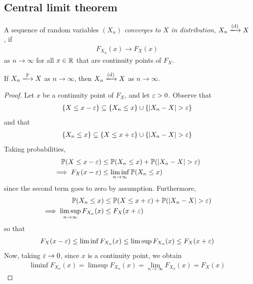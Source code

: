 \documentclass{../template/note}
\begin{document}
    \subsection{Central limit theorem}

    \begin{definition}
        A sequence of random variables \((X_n)\) \emph{converges to \(X\) in distribution}, \(X_n \dto X\), if
        \begin{align*}
            F_{X_n}(x) \to F_X(x)
        \end{align*}
        as \(n \to \infty\) for all \(x \in \mathbb R\) that are continuity points of \(F_X\).
    \end{definition}

    
    \begin{proposition}
        If \(X_n \pto X\) as \(n \to \infty\), then \(X_n \dto X\) as \(n \to \infty\).
    \end{proposition}
    
    \begin{proof}
        Let \(x\) be a continuity point of \(F_X\), and let \(\varepsilon > 0\). Observe that
        \begin{align*}
            \{X \leq x - \varepsilon\} \subseteq \{X_n \leq x\} \cup \{|X_n-X| > \varepsilon\}
        \end{align*}
        and that
        \begin{align*}
            \{X_n \leq x\} \subseteq \{X \leq x+\varepsilon\} \cup \{|X_n-X| > \varepsilon\}
        \end{align*}
        Taking probabilities,
        \begin{align*}
            \mathbb P(X \leq x-\varepsilon) &\leq \mathbb P(X_n \leq x) + \mathbb P(|X_n-X| > \varepsilon) \\
            \implies F_X(x-\varepsilon) &\leq \liminf_{n \to \infty} \mathbb P(X_n \leq x)
        \end{align*}
        since the second term goes to zero by assumption. Furthermore,
        \begin{align*}
            \mathbb P(X_n \leq x) &\leq \mathbb P(X \leq x + \varepsilon) + \mathbb P(|X_n-X| > \varepsilon) \\
            \implies \limsup_{n \to \infty} F_{X_n}(x) &\leq F_X(x+\varepsilon)
        \end{align*}
        so that
        \begin{align*}
            F_X(x-\varepsilon) \leq \liminf F_{X_n}(x) \leq \limsup F_{X_n}(x) \leq F_X(x+\varepsilon)
        \end{align*}
        Now, taking \(\varepsilon \to 0\), since \(x\) is a continuity point, we obtain
        \begin{align*}
            \liminf F_{X_n}(x) = \limsup F_{X_n}(x) = \lim_{n \to \infty} F_{X_n}(x) = F_X(x)
        \end{align*}
    \end{proof}
\end{document}
